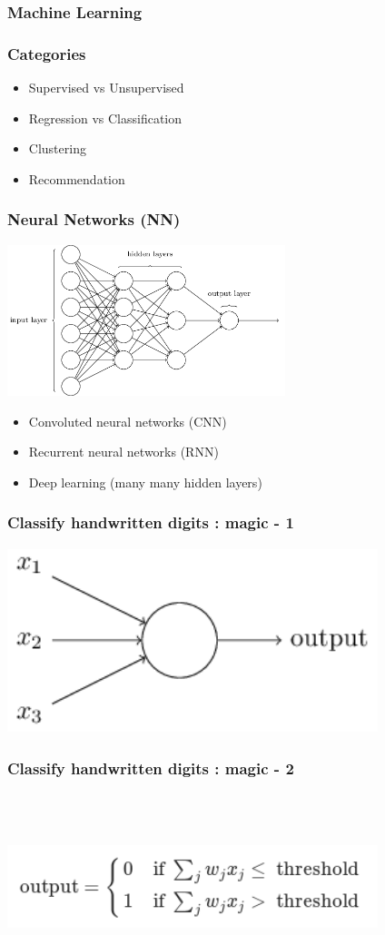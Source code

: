 \documentclass{beamer}
\begin{document}
\subsubsection{Machine Learning}
\begin{frame}
  \frametitle{Categories}
  \begin{itemize}
  \item Supervised vs Unsupervised
  \item Regression vs Classification
  \item Clustering
  \item Recommendation
  \end{itemize}
\end{frame}
\begin{frame}
  \frametitle{Neural Networks (NN)}
  \includegraphics[height=4.4cm]{tikz11.png}
  \begin{itemize}
  \item Convoluted neural networks (CNN)
  \item Recurrent neural networks (RNN)
  \item Deep learning (many many hidden layers)
  \end{itemize}
\end{frame}
\begin{frame}
  \frametitle{Classify handwritten digits : magic - 1}
  \includegraphics[height=5.4cm,width=10.8cm]{tikz0.png}
\end{frame}
\begin{frame}
  \frametitle{Classify handwritten digits : magic - 2}
  \includegraphics[height=5.4cm,width=10.8cm]{screenshot_2017-05-23_13-10-52.png}
\end{frame}
\end{document}
